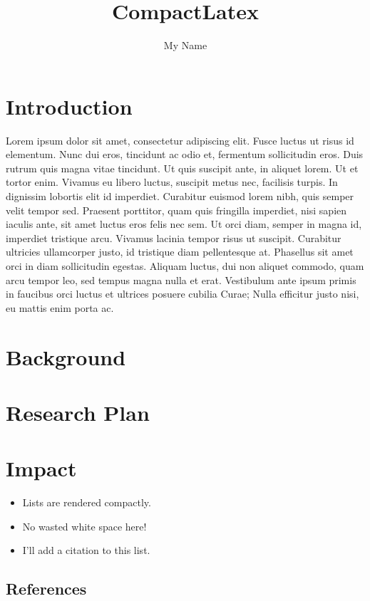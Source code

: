 \documentclass{compacttex}
\title{CompactLatex}
\author{My Name}
\begin{document}
\printtitle

\section{Introduction}
Lorem ipsum dolor sit amet, consectetur adipiscing elit. Fusce luctus ut risus id elementum. Nunc dui eros, tincidunt ac odio et, fermentum sollicitudin eros. Duis rutrum quis magna vitae tincidunt. Ut quis suscipit ante, in aliquet lorem. Ut et tortor enim. Vivamus eu libero luctus, suscipit metus nec, facilisis turpis.\autocite{2006RepresentationsAlgorithms} In dignissim lobortis elit id imperdiet. Curabitur euismod lorem nibh, quis semper velit tempor sed. Praesent porttitor, quam quis fringilla imperdiet, nisi sapien iaculis ante, sit amet luctus eros felis nec sem. Ut orci diam, semper in magna id, imperdiet tristique arcu. Vivamus lacinia tempor risus ut suscipit. Curabitur ultricies ullamcorper justo, id tristique diam pellentesque at.\autocite{Hu2010EvolvabilityBiology} Phasellus sit amet orci in diam sollicitudin egestas. Aliquam luctus, dui non aliquet commodo, quam arcu tempor leo, sed tempus magna nulla et erat. Vestibulum ante ipsum primis in faucibus orci luctus et ultrices posuere cubilia Curae; Nulla efficitur justo nisi, eu mattis enim porta ac.\autocite{Reisinger2007AcquiringRepresentations}

\section{Background}
\lipsum[3-7]

\section{Research Plan}
\lipsum[8-10]

\section{Impact}
\lipsum[11]
\begin{itemize}
  \item Lists are rendered compactly.
  \item No wasted white space here!
  \item I'll add a citation to this list.\autocite{Reisinger2007AcquiringRepresentations}
\end{itemize}
\lipsum[14]

{
\begin{footnotesize}
\section{References}
\end{footnotesize}
\par}
\end{document}
